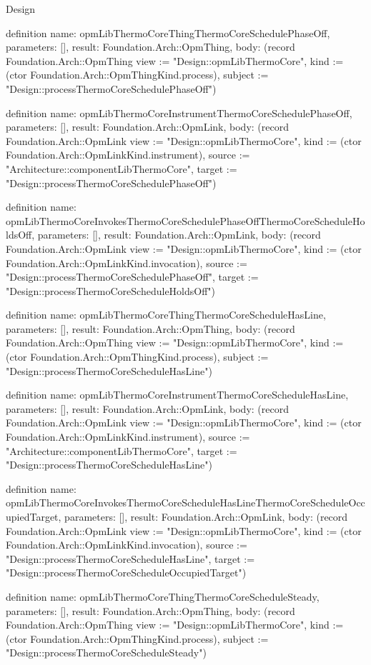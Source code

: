 \begin{lexlean}{Design}
\begin{semanticmodule}
definition{
  name: opmLibThermoCoreThingThermoCoreSchedulePhaseOff,
  parameters: [],
  result: Foundation.Arch::OpmThing,
  body: (record Foundation.Arch::OpmThing {view := "Design::opmLibThermoCore", kind := (ctor Foundation.Arch::OpmThingKind.process), subject := "Design::processThermoCoreSchedulePhaseOff"})
}

definition{
  name: opmLibThermoCoreInstrumentThermoCoreSchedulePhaseOff,
  parameters: [],
  result: Foundation.Arch::OpmLink,
  body: (record Foundation.Arch::OpmLink {view := "Design::opmLibThermoCore", kind := (ctor Foundation.Arch::OpmLinkKind.instrument), source := "Architecture::componentLibThermoCore", target := "Design::processThermoCoreSchedulePhaseOff"})
}

definition{
  name: opmLibThermoCoreInvokesThermoCoreSchedulePhaseOffThermoCoreScheduleHoldsOff,
  parameters: [],
  result: Foundation.Arch::OpmLink,
  body: (record Foundation.Arch::OpmLink {view := "Design::opmLibThermoCore", kind := (ctor Foundation.Arch::OpmLinkKind.invocation), source := "Design::processThermoCoreSchedulePhaseOff", target := "Design::processThermoCoreScheduleHoldsOff"})
}

definition{
  name: opmLibThermoCoreThingThermoCoreScheduleHasLine,
  parameters: [],
  result: Foundation.Arch::OpmThing,
  body: (record Foundation.Arch::OpmThing {view := "Design::opmLibThermoCore", kind := (ctor Foundation.Arch::OpmThingKind.process), subject := "Design::processThermoCoreScheduleHasLine"})
}

definition{
  name: opmLibThermoCoreInstrumentThermoCoreScheduleHasLine,
  parameters: [],
  result: Foundation.Arch::OpmLink,
  body: (record Foundation.Arch::OpmLink {view := "Design::opmLibThermoCore", kind := (ctor Foundation.Arch::OpmLinkKind.instrument), source := "Architecture::componentLibThermoCore", target := "Design::processThermoCoreScheduleHasLine"})
}

definition{
  name: opmLibThermoCoreInvokesThermoCoreScheduleHasLineThermoCoreScheduleOccupiedTarget,
  parameters: [],
  result: Foundation.Arch::OpmLink,
  body: (record Foundation.Arch::OpmLink {view := "Design::opmLibThermoCore", kind := (ctor Foundation.Arch::OpmLinkKind.invocation), source := "Design::processThermoCoreScheduleHasLine", target := "Design::processThermoCoreScheduleOccupiedTarget"})
}

definition{
  name: opmLibThermoCoreThingThermoCoreScheduleSteady,
  parameters: [],
  result: Foundation.Arch::OpmThing,
  body: (record Foundation.Arch::OpmThing {view := "Design::opmLibThermoCore", kind := (ctor Foundation.Arch::OpmThingKind.process), subject := "Design::processThermoCoreScheduleSteady"})
}


\end{semanticmodule}
\end{lexlean}
